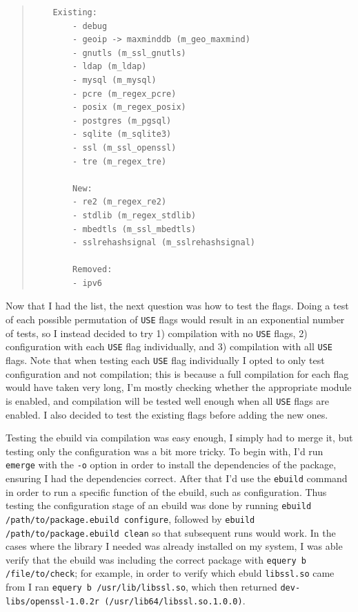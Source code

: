 \documentclass{article}
\begin{document}
\begin{quote}
\begin{verbatim}
	Existing:
        - debug
        - geoip -> maxminddb (m_geo_maxmind)
        - gnutls (m_ssl_gnutls)
        - ldap (m_ldap)
        - mysql (m_mysql)
        - pcre (m_regex_pcre)
        - posix (m_regex_posix)
        - postgres (m_pgsql)
        - sqlite (m_sqlite3)
        - ssl (m_ssl_openssl)
        - tre (m_regex_tre)

        New:
        - re2 (m_regex_re2)
        - stdlib (m_regex_stdlib)
        - mbedtls (m_ssl_mbedtls)
        - sslrehashsignal (m_sslrehashsignal)

        Removed:
        - ipv6
\end{verbatim}
\end{quote}

Now that I had the list, the next question was how to test the flags.  Doing a test of each possible permutation of \texttt{USE} flags would result in an exponential number of tests, so I instead decided to try 1) compilation with no \texttt{USE} flags, 2) configuration with each \texttt{USE} flag individually, and 3) compilation with all \texttt{USE} flags.  Note that when testing each \texttt{USE} flag individually I opted to only test configuration and not compilation; this is because a full compilation for each flag would have taken very long, I'm mostly checking whether the appropriate module is enabled, and compilation will be tested well enough when all \texttt{USE} flags are enabled.  I also decided to test the existing flags before adding the new ones.

Testing the ebuild via compilation was easy enough, I simply had to merge it, but testing only the configuration was a bit more tricky.  To begin with, I'd run \texttt{emerge} with the \texttt{-o} option in order to install the dependencies of the package, ensuring I had the dependencies correct.  After that I'd use the \texttt{ebuild} command in order to run a specific function of the ebuild, such as configuration.  Thus testing the configuration stage of an ebuild was done by running \texttt{ebuild /path/to/package.ebuild configure}, followed by \texttt{ebuild /path/to/package.ebuild clean} so that subsequent runs would work.  In the cases where the library I needed was already installed on my system, I was able verify that the ebuild was including the correct package with \texttt{equery b /file/to/check}; for example, in order to verify which ebuld \texttt{libssl.so} came from I ran \texttt{equery b /usr/lib/libssl.so}, which then returned \texttt{dev-libs/openssl-1.0.2r (/usr/lib64/libssl.so.1.0.0)}.
\end{document}
